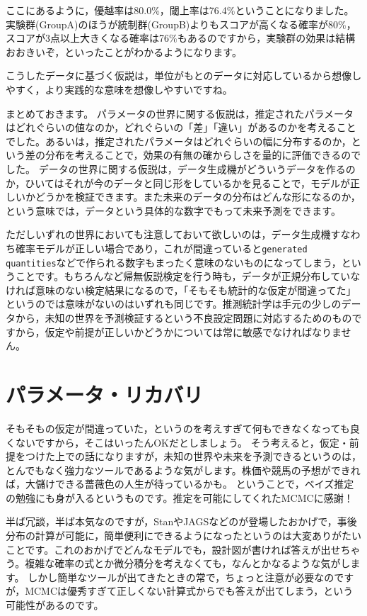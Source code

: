 \documentclass{ltjsbook}
\begin{document}
ここにあるように，優越率は80.0\%，閾上率は76.4\%ということになりました。実験群(GroupA)のほうが統制群(GroupB)よりもスコアが高くなる確率が80\%，スコアが3点以上大きくなる確率は76\%もあるのですから，実験群の効果は結構おおきいぞ，といったことがわかるようになります。

こうしたデータに基づく仮説は，単位がもとのデータに対応しているから想像しやすく，より実践的な意味を想像しやすいですね。

まとめておきます。
パラメータの世界に関する仮説は，推定されたパラメータはどれぐらいの値なのか，どれぐらいの「差」「違い」があるのかを考えることでした。あるいは，推定されたパラメータはどれぐらいの幅に分布するのか，という差の分布を考えることで，効果の有無の確からしさを量的に評価できるのでした。
データの世界に関する仮説は，データ生成機がどういうデータを作るのか，ひいてはそれが今のデータと同じ形をしているかを見ることで，モデルが正しいかどうかを検証できます。また未来のデータの分布はどんな形になるのか，という意味では，データという具体的な数字でもって未来予測をできます。

ただしいずれの世界においても注意しておいて欲しいのは，データ生成機すなわち確率モデルが正しい場合であり，これが間違っていると\verb|generated quantities|などで作られる数字もまったく意味のないものになってしまう，ということです。もちろんなど帰無仮説検定を行う時も，データが正規分布していなければ意味のない検定結果になるので，「そもそも統計的な仮定が間違ってた」というのでは意味がないのはいずれも同じです。推測統計学は手元の少しのデータから，未知の世界を予測検証するという不良設定問題に対応するためのものですから，仮定や前提が正しいかどうかについては常に敏感でなければなりません。

\section{パラメータ・リカバリ}
そもそもの仮定が間違っていた，というのを考えすぎて何もできなくなっても良くないですから，そこはいったんOKだとしましょう。
そう考えると，仮定・前提をつけた上での話になりますが，未知の世界や未来を予測できるというのは，とんでもなく強力なツールであるような気がします。株価や競馬の予想ができれば，大儲けできる薔薇色の人生が待っているかも。
ということで，ベイズ推定の勉強にも身が入るというものです。推定を可能にしてくれたMCMCに感謝！

半ば冗談，半ば本気なのですが，StanやJAGSなどのが登場したおかげで，事後分布の計算が可能に，簡単便利にできるようになったというのは大変ありがたいことです。これのおかげでどんなモデルでも，設計図が書ければ答えが出せちゃう。複雑な確率の式とか微分積分を考えなくても，なんとかなるような気がします。
しかし簡単なツールが出てきたときの常で，ちょっと注意が必要なのですが，MCMCは優秀すぎて正しくない計算式からでも答えが出てしまう，という可能性があるのです。
\end{document}
